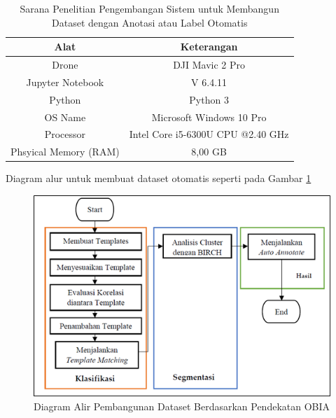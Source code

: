 \begin{singlespace}
	\begin{table}[H]
		\centering
		\caption{Sarana Penelitian Pengembangan Sistem untuk Membangun Dataset dengan Anotasi atau Label Otomatis}
		\label{tbl:Sarana-Penelitian-Pengembangan-Sistem-Untuk-Membangun-Dataset}
		\begin{tabular}{|c|c|}
			\hline
			Alat                  & Keterangan                        \\ \hline
			Drone                 & DJI Mavic 2 Pro                   \\ \hline
			Jupyter Notebook      & V 6.4.11                          \\ \hline
			Python                & Python 3                          \\ \hline
			OS Name               & Microsoft Windows 10 Pro          \\ \hline
			Processor             & Intel Core i5-6300U CPU @2.40 GHz \\ \hline
			Phsyical Memory (RAM) & 8,00 GB                           \\ \hline
		\end{tabular}
	\end{table}
\end{singlespace}

Diagram alur untuk membuat dataset otomatis seperti pada Gambar \ref{img:Diagram-Alir-Pembangunan-Dataset}

\begin{figure}[H]
	\vspace{-0.1cm}
	\begin{center}
		\includegraphics[width=1\columnwidth]{bab3/Gambar/Picture11.png}
	\end{center}
	\vspace{-0.2cm}
	\captionsetup{justification=centering}
	\caption{Diagram Alir Pembangunan Dataset Berdasarkan Pendekatan OBIA}\label{img:Diagram-Alir-Pembangunan-Dataset}
\end{figure}

